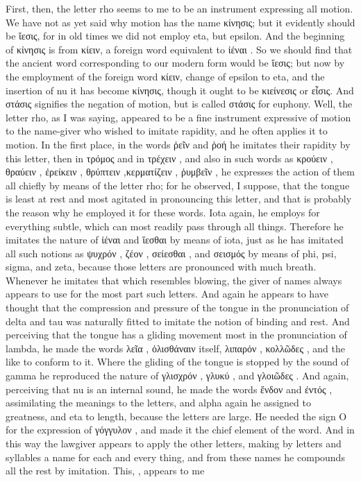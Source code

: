 {{{{{First, then, the letter rho seems to me to be an instrument expressing all motion. We have not as yet said why motion has the name κίνησις; but it evidently should be ἴεσις, for in old times we did not employ eta, but epsilon. And the beginning of κίνησις is from κίειν, a foreign word equivalent to ἰέναι . So we should find that the ancient word corresponding to our modern form would be ἴεσις; but now by the employment of the foreign word κίειν, change of epsilon to eta, and the insertion of nu it has become κίνησις, though it ought to be κιείνεσις or εἶσις.  And στάσις  signifies the negation of motion, but is called στάσις for euphony. Well, the letter rho, as I was saying, appeared to be a fine instrument expressive of motion to the name-giver who wished to imitate rapidity, and he often applies it to motion. In the first place, in the words ῥεῖν  and ῥοή  he imitates their rapidity by this letter,  then in τρόμος  and in τρέχειν , and also in such words as κρούειν , θραύειν , ἐρείκειν , θρύπτειν ,κερματίζειν , ῥυμβεῖν , he expresses the action of them all chiefly by means of the letter rho; for he observed, I suppose, that the tongue is least at rest and most agitated in pronouncing this letter, and that is probably the reason why he employed it for these words. Iota again, he employs for everything subtle, which can most readily pass through all things.  Therefore he imitates the nature of ἰέναι  and ἵεσθαι  by means of iota, just as he has imitated all such notions as ψυχρόν , ζέον , σείεσθαι , and σεισμός  by means of phi, psi, sigma, and zeta, because those letters are pronounced with much breath. Whenever he imitates that which resembles blowing, the giver of names always appears to use for the most part such letters. And again he appears to have thought that the compression and pressure of the tongue in the pronunciation of delta and tau was naturally fitted  to imitate the notion of binding and rest. And perceiving that the tongue has a gliding movement most in the pronunciation of lambda, he made the words λεῖα , ὀλισθάναιν  itself, λιπαρόν , κολλῶδες , and the like to conform to it. Where the gliding of the tongue is stopped by the sound of gamma he reproduced the nature of γλισχρόν , γλυκύ , and γλοιῶδες .  And again, perceiving that nu is an internal sound, he made the words ἔνδον  and ἐντός , assimilating the meanings to the letters, and alpha again he assigned to greatness, and eta to length, because the letters are large. He needed the sign Ο for the expression of γόγγυλον , and made it the chief element of the word. And in this way the lawgiver appears to apply the other letters, making by letters and syllables a name for each and every thing, and from these names he compounds all the rest by imitation.  This, \hermogenesspeaks, appears to me }}}}}
